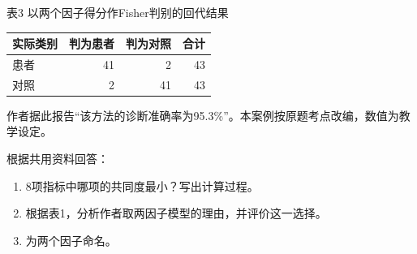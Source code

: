表3 \quad 以两个因子得分作Fisher判别的回代结果

\begin{center}\small\setlength{\tabcolsep}{6pt}\renewcommand{\arraystretch}{1.18}\begin{tabular}{@{}lrrr@{}}
\toprule
实际类别 & 判为患者 & 判为对照 & 合计 \\
\midrule
患者 & 41 & 2 & 43 \\
对照 & 2 & 41 & 43 \\
\bottomrule\end{tabular}\end{center}

作者据此报告``该方法的诊断准确率为95.3\%''。本案例按原题考点改编，数值为教学设定。

\par\addvspace{6pt}\noindent\begin{minipage}{\linewidth}


根据共用资料回答：

\begin{enumerate}
\def\labelenumi{\arabic{enumi}.}
\tightlist
\item
  8项指标中哪项的共同度最小？写出计算过程。
\item
  根据表1，分析作者取两因子模型的理由，并评价这一选择。
\item
  为两个因子命名。
\end{enumerate}


\end{minipage}\par\vspace{4pt}

